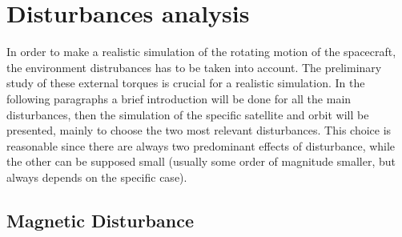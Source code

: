\section{Disturbances analysis}
\label{subsec:disturbances_analysis}

In order to make a realistic simulation of the rotating motion of the spacecraft, the environment 
distrubances has to be taken into account. The preliminary study of these external torques is 
crucial for a realistic simulation. In the following paragraphs a brief introduction will be 
done for all the main disturbances, then the simulation of the specific satellite and orbit
will be presented, mainly to choose the two most relevant disturbances. This choice is reasonable 
since there are always two predominant effects of disturbance, while the other can be supposed small 
(usually some order of magnitude smaller, but always depends on the specific case). 


\subsection{Magnetic Disturbance}
\label{subsec:dist_mag}



